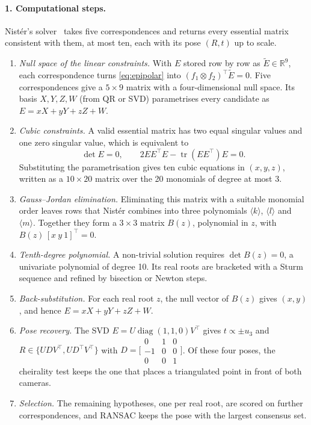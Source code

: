 \documentclass[11pt,a4paper]{article}
\begin{document}
\paragraph{1. Computational steps.}
Nist\'er's solver~\cite{nister2003efficient} takes five correspondences and returns
every essential matrix consistent with them, at most ten, each with its pose $(R, t)$
up to scale.
\begin{enumerate}
  \item \emph{Null space of the linear constraints.} With $E$ stored row by row as
    $\tilde E \in \mathbb{R}^9$, each correspondence turns \eqref{eq:epipolar} into
    $(f_1 \otimes f_2)^\top \tilde E = 0$. Five correspondences give a $5\times 9$
    matrix with a four-dimensional null space. Its basis $X, Y, Z, W$ (from QR or SVD)
    parametrises every candidate as $E = xX + yY + zZ + W$.
  \item \emph{Cubic constraints.} A valid essential matrix has two equal singular
    values and one zero singular value, which is equivalent to
    \begin{equation}
      \det E = 0, \qquad 2EE^\top E - \operatorname{tr}(EE^\top)E = 0 .
      \label{eq:cubic}
    \end{equation}
    Substituting the parametrisation gives ten cubic equations in $(x,y,z)$, written
    as a $10\times 20$ matrix over the 20 monomials of degree at most 3.
  \item \emph{Gauss--Jordan elimination.} Eliminating this matrix with a suitable
    monomial order leaves rows that Nist\'er combines into three polynomials
    $\langle k\rangle$, $\langle l\rangle$ and $\langle m\rangle$. Together they form a
    $3\times 3$ matrix $B(z)$, polynomial in $z$, with $B(z)\,[x\ y\ 1]^\top = 0$.
  \item \emph{Tenth-degree polynomial.} A non-trivial solution requires
    $\det B(z) = 0$, a univariate polynomial of degree 10. Its real roots are
    bracketed with a Sturm sequence and refined by bisection or Newton steps.
  \item \emph{Back-substitution.} For each real root $z$, the null vector of $B(z)$
    gives $(x, y)$, and hence $E = xX + yY + zZ + W$.
  \item \emph{Pose recovery.} The SVD $E = U\operatorname{diag}(1,1,0)V^\top$ gives
    $t \propto \pm u_3$ and $R \in \{UDV^\top, UD^\top V^\top\}$ with
    $D = \bigl[\begin{smallmatrix}0&1&0\\-1&0&0\\0&0&1\end{smallmatrix}\bigr]$.
    Of these four poses, the cheirality test keeps the one that places a
    triangulated point in front of both cameras.
  \item \emph{Selection.} The remaining hypotheses, one per real root, are scored on
    further correspondences, and RANSAC keeps the pose with the largest consensus set.
\end{enumerate}
\end{document}
